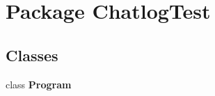 \hypertarget{namespace_chatlog_test}{\section{Package Chatlog\-Test}
\label{namespace_chatlog_test}
}
\subsection*{Classes}
\begin{DoxyCompactItemize}
\item 
class {\bfseries Program}
\end{DoxyCompactItemize}
